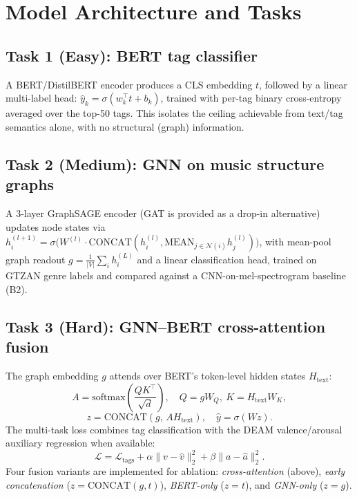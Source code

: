 \documentclass[10pt,twocolumn]{article}
\begin{document}
\section{Model Architecture and Tasks}

\subsection{Task 1 (Easy): BERT tag classifier}
A BERT/DistilBERT encoder produces a CLS embedding $t$, followed by a
linear multi-label head: $\hat{y}_k = \sigma(w_k^\top t + b_k)$, trained
with per-tag binary cross-entropy averaged over the top-50 tags. This
isolates the ceiling achievable from text/tag semantics alone, with no
structural (graph) information.

\subsection{Task 2 (Medium): GNN on music structure graphs}
A 3-layer GraphSAGE encoder (GAT is provided as a drop-in alternative)
updates node states via
$h_i^{(l+1)} = \sigma\big(W^{(l)} \cdot \text{CONCAT}(h_i^{(l)}, \text{MEAN}_{j\in\mathcal{N}(i)} h_j^{(l)})\big)$,
with mean-pool graph readout $g = \frac{1}{|V|}\sum_i h_i^{(L)}$ and a
linear classification head, trained on GTZAN genre labels and compared
against a CNN-on-mel-spectrogram baseline (B2).

\subsection{Task 3 (Hard): GNN--BERT cross-attention fusion}
The graph embedding $g$ attends over BERT's token-level hidden states
$H_{\text{text}}$:
\begin{equation}
A = \text{softmax}\!\left(\frac{QK^\top}{\sqrt{d}}\right), \quad
Q = gW_Q,\ K = H_{\text{text}}W_K,
\end{equation}
\begin{equation}
z = \text{CONCAT}(g,\, AH_{\text{text}}), \quad \hat{y} = \sigma(Wz).
\end{equation}
The multi-task loss combines tag classification with the DEAM
valence/arousal auxiliary regression when available:
\begin{equation}
\mathcal{L} = \mathcal{L}_{\text{tags}} + \alpha\lVert v - \hat{v}\rVert_2^2 + \beta \lVert a - \hat{a}\rVert_2^2.
\end{equation}
Four fusion variants are implemented for ablation: \emph{cross-attention}
(above), \emph{early concatenation} ($z = \text{CONCAT}(g,t)$),
\emph{BERT-only} ($z=t$), and \emph{GNN-only} ($z=g$).
\end{document}
